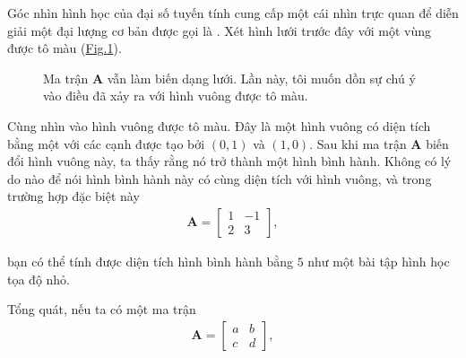 \documentclass[letterpaper,11pt,english]{sphinxmanual}
\begin{document}
Góc nhìn hình học của đại số tuyến tính cung cấp một cái nhìn trực quan
để diễn giải một đại lượng cơ bản được gọi là . Xét hình lưới
trước đây với một vùng được tô màu (\hyperref[\detokenize{chapter_appendix_math/geometry-linear-algebric-ops_vn:fig-grid-filled}]{Fig.\@ \ref{\detokenize{chapter_appendix_math/geometry-linear-algebric-ops_vn:fig-grid-filled}}}).



\begin{figure}[H]
\centering
\capstart

\noindent{}
\caption{Ma trận \(\mathbf{A}\) vẫn làm biến dạng lưới. Lần này, tôi muốn
dồn sự chú ý vào điều đã xảy ra với hình vuông được tô màu.}\label{\detokenize{chapter_appendix_math/geometry-linear-algebric-ops_vn:id11}}\label{\detokenize{chapter_appendix_math/geometry-linear-algebric-ops_vn:fig-grid-filled}}\end{figure}



Cùng nhìn vào hình vuông được tô màu. Đây là một hình vuông có diện tích
bằng một với các cạnh được tạo bởi \((0, 1)\) và \((1, 0)\). Sau
khi ma trận \(\mathbf{A}\) biến đổi hình vuông này, ta thấy rằng nó
trở thành một hình bình hành. Không có lý do nào để nói hình bình hành
này có cùng diện tích với hình vuông, và trong trường hợp đặc biệt này
\begin{equation}\label{equation:chapter_appendix_math/geometry-linear-algebric-ops_vn:chapter_appendix_math/geometry-linear-algebric-ops_vn:24}
\begin{split}\mathbf{A} = \begin{bmatrix}
1 & -1 \\
2 & 3
\end{bmatrix},\end{split}
\end{equation}


bạn có thể tính được diện tích hình bình hành bằng \(5\) như một bài
tập hình học tọa độ nhỏ.



Tổng quát, nếu ta có một ma trận
\begin{equation}\label{equation:chapter_appendix_math/geometry-linear-algebric-ops_vn:chapter_appendix_math/geometry-linear-algebric-ops_vn:25}
\begin{split}\mathbf{A} = \begin{bmatrix}
a & b \\
c & d
\end{bmatrix},\end{split}
\end{equation}
\end{document}
